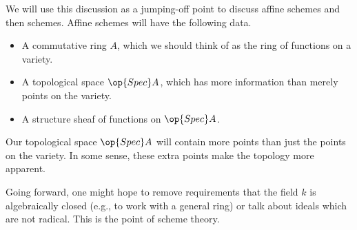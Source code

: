 \documentclass[../notes.tex]{subfiles}
\begin{document}
We will use this discussion as a jumping-off point to discuss affine schemes and then schemes. Affine schemes will have the following data.
\begin{itemize}
	\item A commutative ring $A$, which we should think of as the ring of functions on a variety.
	\item A topological space $\op{Spec}A$, which has more information than merely points on the variety.
	\item A structure sheaf of functions on $\op{Spec}A$.
\end{itemize}
\begin{remark}
	Our topological space $\op{Spec}A$ will contain more points than just the points on the variety. In some sense, these extra points make the topology more apparent.
\end{remark}
\begin{remark}
	Going forward, one might hope to remove requirements that the field $k$ is algebraically closed (e.g., to work with a general ring) or talk about ideals which are not radical. This is the point of scheme theory.
\end{remark}
\end{document}
